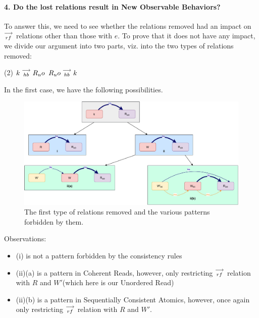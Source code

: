 \paragraph{4. Do the lost relations result in New Observable Behaviors?}

        To answer this, we need to see whether the relations removed had an impact on $\stackrel{\longrightarrow}{_{rf}}$ relations other than those with $e$. To prove that it does not have any impact, we divide our argument into two parts, viz. into the two types of relations removed:

        \begin{tasks}(2)
            \task $k\stackrel{\longrightarrow}{_{hb}}R_uo$ 
            \task $R_uo\stackrel{\longrightarrow}{_{hb}}k$ 
        \end{tasks}

        In the first case, we have the following possibilities. 
        \begin{figure}[H]
            \centering
            \includegraphics[scale=0.5]{Elimination/ReadElimProof/ProofParts/Part4_Case1.pdf}
            \caption{The first type of relations removed and the various patterns forbidden by them.}
        \end{figure}

        Observations:
        \begin{itemize}
            \item (i) is not a pattern forbidden by the consistency rules
            \item (ii)(a) is a pattern in Coherent Reads, however, only restricting $\stackrel{\longrightarrow}{_{rf}}$ relation with $R$ and $W'$(which here is our Unordered Read)
            \item (ii)(b) is a pattern in Sequentially Consistent Atomics, however, once again only restricting $\stackrel{\longrightarrow}{_{rf}}$ relation with $R$ and $W'$. 
        \end{itemize}


